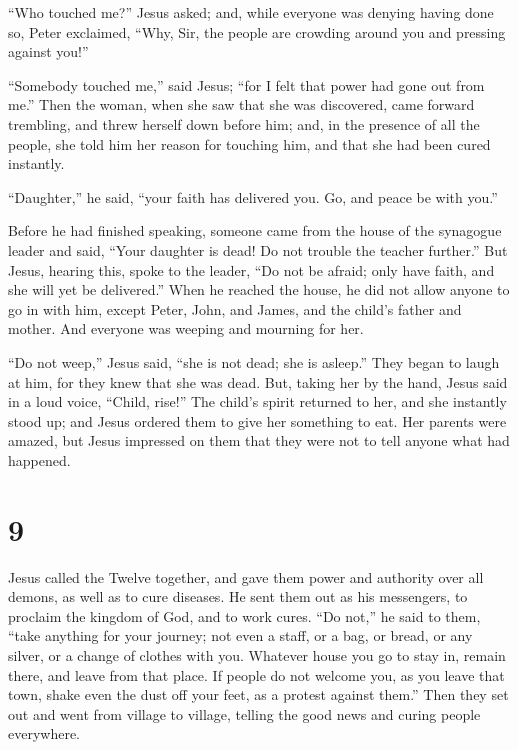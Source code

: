 ``Who touched me?'' Jesus asked; and, while everyone was
denying having done so, Peter exclaimed, ``Why, Sir, the people are
crowding around you and pressing against you!''

 ``Somebody touched me,'' said Jesus; ``for I felt that
power had gone out from me.''  Then the woman, when she saw
that she was discovered, came forward trembling, and threw herself down
before him; and, in the presence of all the people, she told him her
reason for touching him, and that she had been cured instantly.

 ``Daughter,'' he said, ``your faith has delivered you. Go,
and peace be with you.''

 Before he had finished speaking, someone came from the
house of the synagogue leader and said, ``Your daughter is dead! Do not
trouble the teacher further.''  But Jesus, hearing this,
spoke to the leader, ``Do not be afraid; only have faith, and she will
yet be delivered.''  When he reached the house, he did not
allow anyone to go in with him, except Peter, John, and James, and the
child's father and mother.  And everyone was weeping and
mourning for her.

``Do not weep,'' Jesus said, ``she is not dead; she is asleep.''
 They began to laugh at him, for they knew that she was
dead.  But, taking her by the hand, Jesus said in a loud
voice, ``Child, rise!''  The child's spirit returned to
her, and she instantly stood up; and Jesus ordered them to give her
something to eat.  Her parents were amazed, but Jesus
impressed on them that they were not to tell anyone what had happened.

\hypertarget{section-7}{%
\section{9}\label{section-7}}

 Jesus called the Twelve together, and gave them power and
authority over all demons, as well as to cure diseases.  He
sent them out as his messengers, to proclaim the kingdom of God, and to
work cures.  ``Do not,'' he said to them, ``take anything
for your journey; not even a staff, or a bag, or bread, or any silver,
or a change of clothes with you.  Whatever house you go to
stay in, remain there, and leave from that place.  If people
do not welcome you, as you leave that town, shake even the dust off your
feet, as a protest against them.''  Then they set out and
went from village to village, telling the good news and curing people
everywhere.

